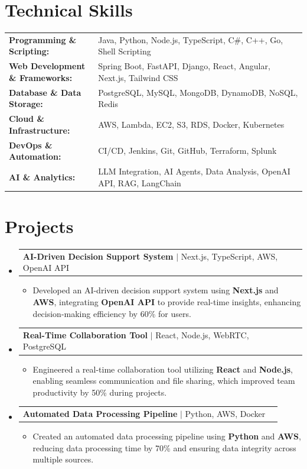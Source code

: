 \documentclass[letterpaper,10pt]{article}
\makeatletter
\newcommand{\resumeItem}[1]{
  \item{\fontsize{8pt}{9pt}\selectfont
    #1 \vspace{-3pt}
  }
}
\newcommand{\resumeProjectHeading}[2]{
    \item
    \begin{tabular*}{1.001\textwidth}{l@{\extracolsep{\fill}}r}
      \fontsize{8.5pt}{10pt}#1 & \textbf{\fontsize{8.5pt}{10pt} #2}\\
    \end{tabular*}\vspace{-7pt}
}
\newcommand{\resumeSubHeadingListStart}{\begin{itemize}[leftmargin=0pt, label={}]}
\newcommand{\resumeSubHeadingListEnd}{\end{itemize}}
\newcommand{\resumeItemListStart}{\begin{itemize}[leftmargin=*]}
\newcommand{\resumeItemListEnd}{\end{itemize}\vspace{-5pt}}
\makeatother
\begin{document}
\section{Technical Skills}
        \vspace{-14pt}
        \begin{table}[h]
            \fontsize{8pt}{9pt}\selectfont
            \begin{tabular}{p{0.3\linewidth} p{0.7\linewidth}}
                \textbf{Programming \& Scripting:} & Java, Python, Node.js, TypeScript, C\#, C++, Go, Shell Scripting \\
                \textbf{Web Development \& Frameworks:} & Spring Boot, FastAPI, Django, React, Angular, Next.js, Tailwind CSS \\
                \textbf{Database \& Data Storage:} & PostgreSQL, MySQL, MongoDB, DynamoDB, NoSQL, Redis \\
                \textbf{Cloud \& Infrastructure:} & AWS, Lambda, EC2, S3, RDS, Docker, Kubernetes \\
                \textbf{DevOps \& Automation:} & CI/CD, Jenkins, Git, GitHub, Terraform, Splunk \\
                \textbf{AI \& Analytics:} & LLM Integration, AI Agents, Data Analysis, OpenAI API, RAG, LangChain \\
            \end{tabular}
        \end{table}
 \vspace{-18pt}

\section{Projects}
    \vspace{-5pt}
    \resumeSubHeadingListStart
          \resumeProjectHeading
            {\textbf{AI-Driven Decision Support System} $|$ Next.js, TypeScript, AWS, OpenAI API}{}
            \resumeItemListStart
                \resumeItem{Developed an AI-driven decision support system using \textbf{Next.js} and \textbf{AWS}, integrating \textbf{OpenAI API} to provide real-time insights, enhancing decision-making efficiency by 60\% for users.}
            \resumeItemListEnd
        \vspace{-12pt}
    
        \resumeProjectHeading
            {\textbf{Real-Time Collaboration Tool} $|$ React, Node.js, WebRTC, PostgreSQL}{}
        \resumeItemListStart
                \resumeItem{Engineered a real-time collaboration tool utilizing \textbf{React} and \textbf{Node.js}, enabling seamless communication and file sharing, which improved team productivity by 50\% during projects.}
        \resumeItemListEnd
      \vspace{-12pt}
      \resumeProjectHeading
        {\textbf{Automated Data Processing Pipeline} $|$ Python, AWS, Docker}{}
    \resumeItemListStart
            \resumeItem{Created an automated data processing pipeline using \textbf{Python} and \textbf{AWS}, reducing data processing time by 70\% and ensuring data integrity across multiple sources.}
    \resumeItemListEnd
    \resumeSubHeadingListEnd
\end{document}
